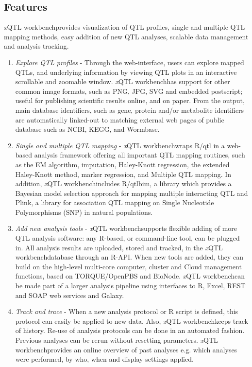 \documentclass[8pt, twoside, a5paper]{report}
\newcommand{\italic}[1]{\textit{#1}}
\newcommand{\xqtlwb}{{\it x}QTL workbench}
\begin{document}
\subsection{Features}
\xqtlwb provides visualization of QTL profiles, single and multiple QTL mapping methods, easy addition of new QTL 
analyses, scalable data management and analysis tracking.

\begin{enumerate}\itemsep1pt
\item \italic{Explore QTL profiles} - Through the web-interface, users can explore mapped QTLs, and underlying information 
by viewing QTL plots in an interactive scrollable and zoomable window. \xqtlwb has support for other common image 
formats, such as PNG, JPG, SVG and embedded postscript; useful for publishing scientific results online, and on 
paper. From the output, main database identifiers, such as gene, protein and/or metabolite identifiers are 
automatically linked-out to matching external web pages of public database such as NCBI, KEGG, and Wormbase.

\item \italic{Single and multiple QTL mapping} - \xqtlwb wraps R/qtl\cite{Broman:2003, Arends:2010} in a web-based analysis
framework offering all important QTL mapping routines, such as the EM algorithm, imputation, Haley-Knott regression, 
the extended Haley-Knott method, marker regression, and Multiple QTL mapping. In addition, \xqtlwb includes 
R/qtlbim, a library which provides a Bayesian model selection approach for mapping multiple interacting QTL\cite{Yandell:2007} 
and Plink, a library for association QTL mapping on Single Nucleotide Polymorphisms (SNP) in natural 
populations\cite{Purcell:2007}.

\item \italic{Add new analysis tools} - \xqtlwb supports flexible adding of more QTL analysis software: any R-based, or 
command-line tool, can be plugged in. All analysis results are uploaded, stored and tracked, in the \xqtlwb database 
through an R-API. When new tools are added, they can build on the high-level multi-core computer, cluster and 
Cloud management functions, based on TORQUE/OpenPBS and BioNode\cite{Prins:2012}. \xqtlwb can be made part of a larger 
analysis pipeline using interfaces to R, Excel, REST and SOAP web services and Galaxy\cite{Goecks:2010}.

\item \italic{Track and trace} - When a new analysis protocol or R script is defined, this protocol can 
easily be applied to new data. Also, \xqtlwb keeps track of history. Re-use of analysis protocols can be done in an 
automated fashion. Previous analyses can be rerun without resetting parameters. \xqtlwb provides an online overview 
of past analyses e.g. which analyses were performed, by who, when and display settings applied.


\end{enumerate}
\end{document}
